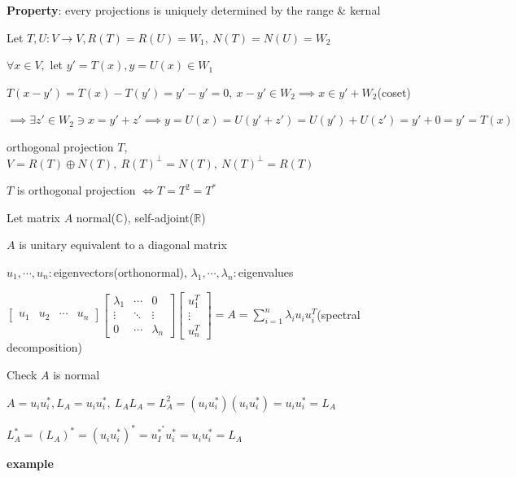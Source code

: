 \textbf{Property}: every projections is uniquely determined by the range \& kernal

Let $T,U: V \rightarrow V,R(T)=R(U)=W_1,~N(T)=N(U)=W_2$

$\forall x \in V,$ let $y' = T(x),y=U(x) \in W_1$

$T(x-y') = T(x) - T(y') = y'-y' = 0,~x - y' \in W_2 \implies x \in y' + W_2$(coset) 

$\implies \exists z' \in W_2 \ni x=y'+z' \implies y = U(x) = U(y'+z') = U(y')+U(z') = y'+0=y'=T(x)$

\newpage

\begin{thm*}
	orthogonal projection $T$, $V = R(T)\oplus N(T),~R(T)^{\perp} = N(T),~N(T)^{\perp} = R(T)$
	
	$T$ is orthogonal projection $\Leftrightarrow T = T^2 = T^*$
\end{thm*}

\begin{thm*}
	Let matrix $A$ normal($\mathbb{C}$), self-adjoint($\mathbb{R}$)
	
	$A$ is unitary equivalent to a diagonal matrix
	
	$u_1,\cdots,u_n:$eigenvectors(orthonormal), $\lambda_1,\cdots,\lambda_n:$eigenvalues
	
	$\left[\begin{matrix}
		u_1&u_2&\cdots&u_n
	\end{matrix}\right]\left[\begin{matrix}
		\lambda_1&\cdots&0\\
		\vdots&\ddots&\vdots\\
		0&\cdots&\lambda_n
	\end{matrix}\right]\left[\begin{matrix}
		u_1^{T}\\\vdots\\u_n^T
	\end{matrix}\right] = A  = \sum^{n}_{i=1}\lambda_iu_iu_i^T$(spectral decomposition)

\end{thm*}

Check $A$ is normal

$A = u_iu_i^*, L_A = u_iu_i^*,~L_AL_A = L_A^2 = (u_iu_i^*)(u_iu_i^*)=u_iu_i^*=L_A$

$L_A^* = (L_A)^* = (u_iu_i^*)^* = u_I^{*^*}u_i^{*} = u_iu_i^{*}=L_A$

\textbf{example}

